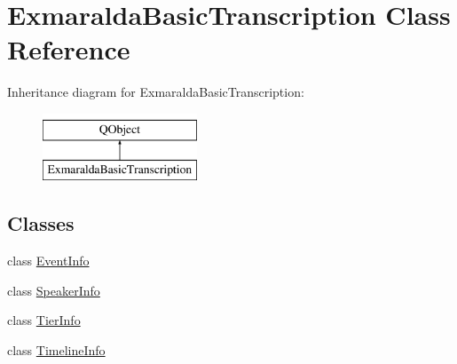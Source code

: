 \hypertarget{class_exmaralda_basic_transcription}{}\section{Exmaralda\+Basic\+Transcription Class Reference}
\label{class_exmaralda_basic_transcription}
Inheritance diagram for Exmaralda\+Basic\+Transcription\+:\begin{figure}[H]
\begin{center}
\leavevmode
\includegraphics[height=2.000000cm]{class_exmaralda_basic_transcription}
\end{center}
\end{figure}
\subsection*{Classes}
\begin{DoxyCompactItemize}
\item 
class \hyperlink{class_exmaralda_basic_transcription_1_1_event_info}{Event\+Info}
\item 
class \hyperlink{class_exmaralda_basic_transcription_1_1_speaker_info}{Speaker\+Info}
\item 
class \hyperlink{class_exmaralda_basic_transcription_1_1_tier_info}{Tier\+Info}
\item 
class \hyperlink{class_exmaralda_basic_transcription_1_1_timeline_info}{Timeline\+Info}
\end{DoxyCompactItemize}
